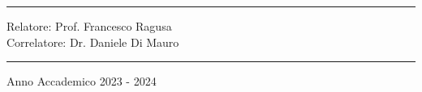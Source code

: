 \begin{titlepage}
\begin{minipage}[b]{8 cm}
\bigskip

\hrule
\end{minipage}
\bigskip


\bigskip


\bigskip


\bigskip


\bigskip


\bigskip


\bigskip


\bigskip


\bigskip


\bigskip


\bigskip

{\raggedleft
Relatore: Prof. Francesco Ragusa \\
Correlatore: Dr. Daniele Di Mauro
\par}


\bigskip


\bigskip


\bigskip


\bigskip

\hrule

\bigskip

{\centering
Anno Accademico 2023 - 2024
\par}
\end{titlepage}
